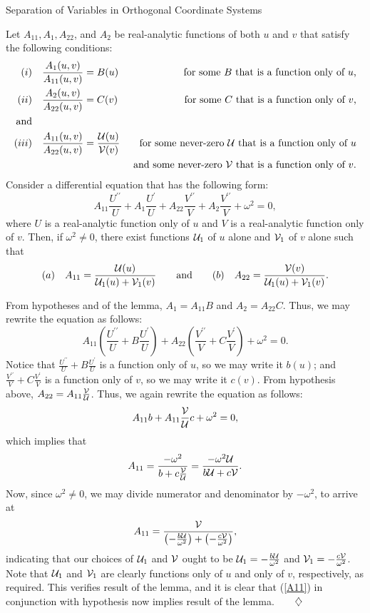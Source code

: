 \begin{section}{Separation of Variables in Orthogonal Coordinate Systems}
\begin{lemma}
\label{fracform}
Let $A_{11}, A_1, A_{22}$, and $A_2$ be real-analytic functions of both $u$ and $v$ that satisfy the following conditions:
\begin{eqnarray*}
\pn{i} & \quad   \frac{A_1(u,v)}{A_{11}(u,v)} = B(u) & \mbox{ for some $B$ that is a function only of $u$,} \\
\pn{ii} & \quad  \frac{A_2(u,v)}{A_{22}(u,v)} = C(v) & \mbox{ for some $C$ that is a function only of $v$,} \\
\mbox{\raggedleft and} & & \\
\pn{iii} & \quad \frac{A_{11}(u,v)}{A_{22}(u,v)} = \frac{\cU(u)}{\cV(v)} & \mbox{ for some never-zero $\cU$ that is a function only of $u$} \\
 	 &								 & \mbox{ and some never-zero $\cV$ that is a function only of $v$.}
\end{eqnarray*}
Consider a differential equation that has the following form:
\[
A_{11} \frac{U^{\prime\prime}}{U} + A_1 \frac{U^{\prime}}{U} + A_{22} \frac{V^{\prime\prime}}{V} + A_2 \frac{V^{\prime\prime}}{V} + \omega^2 = 0,
\]
where $U$ is a real-analytic function only of $u$ and $V$ is a real-analytic function only of $v$.  Then, if $\omega^2 \not= 0$, there exist functions $\mathcal{U}_1$ of $u$ alone and $\mathcal{V}_1$ of $v$ alone such that
\[
\mbox{$(a)$} \quad A_{11} = \frac{\mathcal{U}(u)}{\mathcal{U}_1(u) + \mathcal{V}_1(v)}
\qquad \mbox{and} \qquad
\mbox{$(b)$} \quad A_{22} = \frac{\mathcal{V}(v)}{\mathcal{U}_1(u) + \mathcal{V}_1(v)}.
\]
\end{lemma}

\proof
From hypotheses  and  of the lemma, $A_1 = A_{11} B$ and $A_2 = A_{22} C$.  Thus, we may rewrite the equation as follows:
\[
A_{11}\left( \frac{U^{\prime\prime}}{U} + B \frac{U^{\prime}}{U} \right) + A_{22}\left( \frac{V^{\prime\prime}}{V} + C \frac{V^{\prime}}{V} \right) + \omega^2 = 0.
\]
Notice that $\frac{U^{\prime\prime}}{U} + B \frac{U^{\prime}}{U}$ is a function only of $u$, so we may write it $b(u)$; and $\frac{V^{\prime\prime}}{V} + C \frac{V^{\prime}}{V}$ is a function only of $v$, so we may write it $c(v)$.  From hypothesis  above, $A_{22} = A_{11} \frac{\mathcal{V}}{\mathcal{U}}$.  Thus, we again rewrite the equation as follows:
\[
A_{11} b + A_{11} \frac{\mathcal{V}}{\mathcal{U}} c + \omega^2 = 0,
\]
which implies that
\[
A_{11} = \frac{-\omega^2}{b + c \frac{\mathcal{V}}{\mathcal{U}}} = \frac{-\omega^2 \mathcal{U}}{b \mathcal{U} + c \mathcal{V}}.
\]
Now, since $\omega^2 \not= 0$, we may divide numerator and denominator by $-\omega^2$, to arrive at
\begin{equation}
\label{A11}
A_{11} = \frac{\mathcal{V}}{\left(-\frac{b \mathcal{U}}{\omega^2}\right) + \left(-\frac{c \mathcal{V}}{\omega^2}\right)},
\end{equation}
indicating that our choices of $\mathcal{U}_1$ and $\mathcal{V}$ ought to be $\mathcal{U}_1 = -\frac{b \mathcal{U}}{\omega^2}$ and $\mathcal{V}_1 = -\frac{c \mathcal{V}}{\omega^2}$.  Note that $\mathcal{U}_1$ and $\mathcal{V}_1$ are clearly functions only of $u$ and only of $v$, respectively, as required.  This verifies result  of the lemma, and it is clear that (\ref{A11}) in conjunction with hypothesis  now implies result  of the lemma.$\qquad \diamondsuit$
\end{section}

